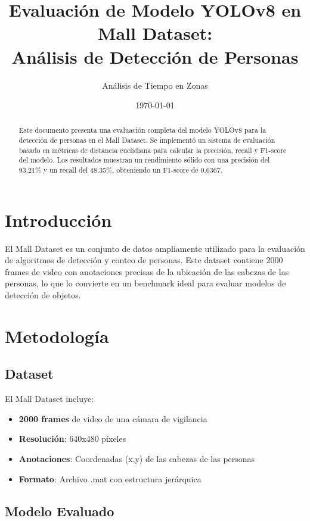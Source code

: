 \documentclass[12pt,a4paper]{article}
\title{\textbf{Evaluación de Modelo YOLOv8 en Mall Dataset: \\Análisis de Detección de Personas}}
\author{Análisis de Tiempo en Zonas}
\date{\today}
\begin{document}
\maketitle

\begin{abstract}
Este documento presenta una evaluación completa del modelo YOLOv8 para la detección de personas en el Mall Dataset. Se implementó un sistema de evaluación basado en métricas de distancia euclidiana para calcular la precisión, recall y F1-score del modelo. Los resultados muestran un rendimiento sólido con una precisión del 93.21\% y un recall del 48.35\%, obteniendo un F1-score de 0.6367.
\end{abstract}

\tableofcontents

\section{Introducción}

El Mall Dataset es un conjunto de datos ampliamente utilizado para la evaluación de algoritmos de detección y conteo de personas. Este dataset contiene 2000 frames de video con anotaciones precisas de la ubicación de las cabezas de las personas, lo que lo convierte en un benchmark ideal para evaluar modelos de detección de objetos.

\section{Metodología}

\subsection{Dataset}

El Mall Dataset incluye:
\begin{itemize}
    \item \textbf{2000 frames} de video de una cámara de vigilancia
    \item \textbf{Resolución}: 640x480 píxeles
    \item \textbf{Anotaciones}: Coordenadas (x,y) de las cabezas de las personas
    \item \textbf{Formato}: Archivo .mat con estructura jerárquica
\end{itemize}

\subsection{Modelo Evaluado}
\end{document}
